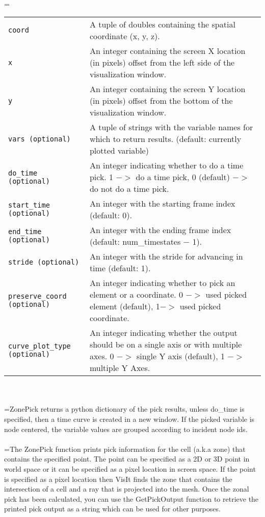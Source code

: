 \documentclass[10pt,a4paper]{report}
\begin{document}
 \\ 
\hangindent=\parindent 
\begin{tabular}{lp{9cm}}
\verb!coord! & A tuple of doubles containing the spatial coordinate (x, y, z). \\
\verb!x! & An integer containing the screen X location (in pixels) offset from the left side of the visualization window. \\
\verb!y! & An integer containing the screen Y location (in pixels) offset from the bottom of the visualization window. \\
\verb!vars (optional)! & A tuple of strings with the variable names for which to return results. (default: currently plotted variable) \\
\verb!do_time (optional)! & An integer indicating whether to do a time pick. 1 $-$$>$ do a time pick, 0 (default) $-$$>$ do not do a time pick. \\
\verb!start_time (optional)! & An integer with the starting frame index (default: 0). \\
\verb!end_time (optional)! & An integer with the ending frame index (default: num\_timestates $-$ 1). \\
\verb!stride (optional)! & An integer with the stride for advancing in time (default: 1). \\
\verb!preserve_coord (optional)! & An integer indicating whether to pick an element or a coordinate. 0 $-$$>$ used picked element (default), 1$-$$>$ used picked coordinate. \\
\verb!curve_plot_type (optional)! & An integer indicating whether the output should be on a single axis or with multiple axes. 0 $-$$>$ single Y axis (default), 1 $-$$>$ multiple Y Axes. \\
\end{tabular} \\[-2mm]


 \\ 
\hangindent=\parindent ZonePick returns a python dictionary of the pick results, unless do\_time is specified, then a time curve is created in a new window. If the picked variable is node centered, the variable values are grouped according to incident node ids. \\[-3mm] 

 \\ 
\hangindent=\parindent The ZonePick function prints pick information for the cell (a.k.a zone) that contains the specified point. The point can be specified as a 2D or 3D point in world space or it can be specified as a pixel location in screen space. If the point is specified as a pixel location then VisIt finds the zone that contains the intersection of a cell and a ray that is projected into the mesh. Once the zonal pick has been calculated, you can use the GetPickOutput function to retrieve the printed pick output as a string which can be used for other purposes. \\[-3mm] 
\end{document}
